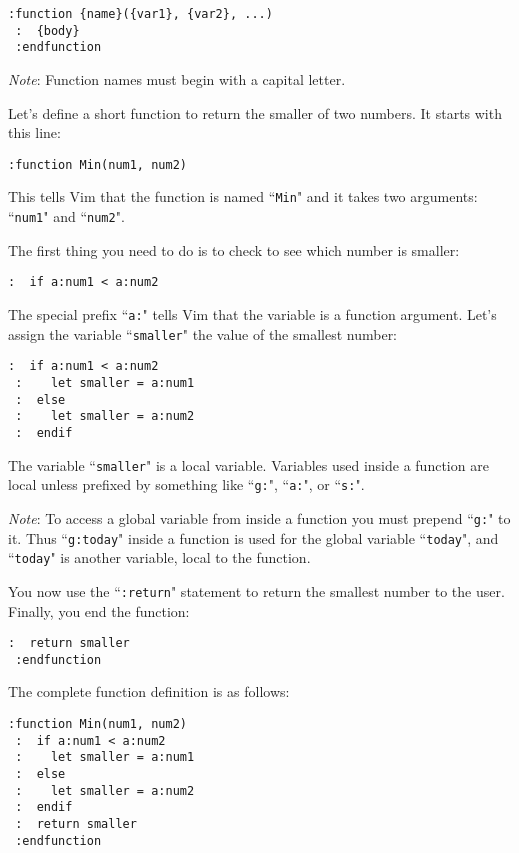 \begin{Verbatim}[samepage=true]
 :function {name}({var1}, {var2}, ...)
 :  {body}
 :endfunction
\end{Verbatim}

\emph{Note}:
Function names must begin with a capital letter.

Let's define a short function to return the smaller of two numbers.
It starts with this line:

\begin{Verbatim}[samepage=true]
 :function Min(num1, num2)
\end{Verbatim}

This tells Vim that the function is named ``\texttt{Min}" and it takes two arguments: ``\texttt{num1}" and ``\texttt{num2}".

The first thing you need to do is to check to see which number is smaller:

\begin{Verbatim}[samepage=true]
 :  if a:num1 < a:num2
\end{Verbatim}

The special prefix ``\texttt{a:}" tells Vim that the variable is a function argument.
Let's assign the variable ``\texttt{smaller}" the value of the smallest number:

\begin{Verbatim}[samepage=true]
 :  if a:num1 < a:num2
 :    let smaller = a:num1
 :  else
 :    let smaller = a:num2
 :  endif
\end{Verbatim}

The variable ``\texttt{smaller}" is a local variable.
Variables used inside a function are local unless prefixed by something like ``\texttt{g:}", ``\texttt{a:}", or ``\texttt{s:}".

\emph{Note}:
To access a global variable from inside a function you must prepend ``\texttt{g:}" to it.
Thus ``\texttt{g:today}" inside a function is used for the global variable ``\texttt{today}", and ``\texttt{today}" is another variable, local to the function.

You now use the ``\texttt{:return}" statement to return the smallest number to the user.
Finally, you end the function:

\begin{Verbatim}[samepage=true]
 :  return smaller
 :endfunction
\end{Verbatim}

The complete function definition is as follows:

\begin{Verbatim}[samepage=true]
 :function Min(num1, num2)
 :  if a:num1 < a:num2
 :    let smaller = a:num1
 :  else
 :    let smaller = a:num2
 :  endif
 :  return smaller
 :endfunction
\end{Verbatim}

